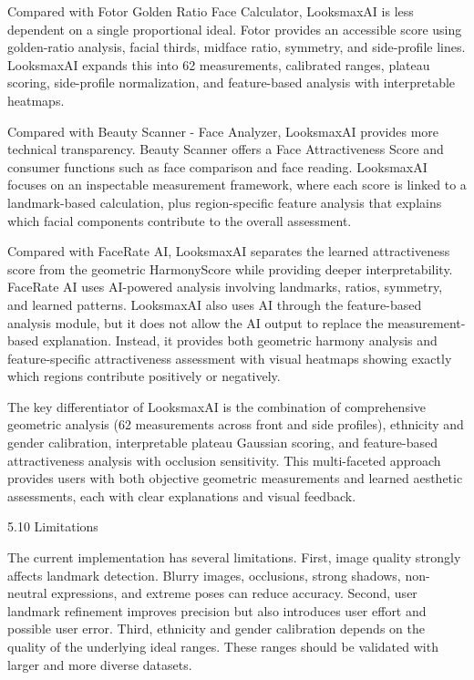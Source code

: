 Compared with Fotor Golden Ratio Face Calculator, LooksmaxAI is less dependent on a single proportional ideal. Fotor provides an accessible score using golden-ratio analysis, facial thirds, midface ratio, symmetry, and side-profile lines. LooksmaxAI expands this into 62 measurements, calibrated ranges, plateau scoring, side-profile normalization, and feature-based analysis with interpretable heatmaps.

Compared with Beauty Scanner - Face Analyzer, LooksmaxAI provides more technical transparency. Beauty Scanner offers a Face Attractiveness Score and consumer functions such as face comparison and face reading. LooksmaxAI focuses on an inspectable measurement framework, where each score is linked to a landmark-based calculation, plus region-specific feature analysis that explains which facial components contribute to the overall assessment.

Compared with FaceRate AI, LooksmaxAI separates the learned attractiveness score from the geometric HarmonyScore while providing deeper interpretability. FaceRate AI uses AI-powered analysis involving landmarks, ratios, symmetry, and learned patterns. LooksmaxAI also uses AI through the feature-based analysis module, but it does not allow the AI output to replace the measurement-based explanation. Instead, it provides both geometric harmony analysis and feature-specific attractiveness assessment with visual heatmaps showing exactly which regions contribute positively or negatively.

The key differentiator of LooksmaxAI is the combination of comprehensive geometric analysis (62 measurements across front and side profiles), ethnicity and gender calibration, interpretable plateau Gaussian scoring, and feature-based attractiveness analysis with occlusion sensitivity. This multi-faceted approach provides users with both objective geometric measurements and learned aesthetic assessments, each with clear explanations and visual feedback.

5.10  Limitations

The current implementation has several limitations. First, image quality strongly affects landmark detection. Blurry images, occlusions, strong shadows, non-neutral expressions, and extreme poses can reduce accuracy. Second, user landmark refinement improves precision but also introduces user effort and possible user error. Third, ethnicity and gender calibration depends on the quality of the underlying ideal ranges. These ranges should be validated with larger and more diverse datasets.

